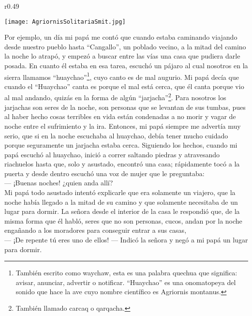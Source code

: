 \ifdefined\EnableIncludeImages
\begin{wrapfigure}{r}{0.49\textwidth}
  \begin{center}
  \vspace{-20pt}
    \texttt{[image: AgriornisSolitariaSmit.jpg]}
  \end{center}
  \vspace{-20pt}
\end{wrapfigure}
\fi
Por ejemplo, un día mi papá me contó que cuando estaba caminando viajando desde nuestro pueblo hasta ``Cangallo'', un poblado vecino, a la mitad del camino la noche lo atrapó, y empezó a buscar entre las vías una casa que pudiera darle posada. En cuanto él estaba en esa tarea, escuchó un pájaro al cual nosotros en la sierra llamamos ``huaychao''\footnote{También escrito como waychaw, esta es una palabra quechua que significa: avisar, anunciar, advertir o notificar. ``Huaychao'' es una onomatopeya del sonido que hace la ave cuyo nombre científico es Agriornis montanus.}, cuyo canto es de mal augurio.
Mi papá decía que cuando el ``Huaychao'' canta es porque el mal está cerca, que él canta porque vio al mal andando, quizás en la forma de algún ``jarjacha''\footnote{También llamado carcaq o qarqacha.}. Para nosotros los jarjachas son seres de la noche, son personas que se levantan de sus tumbas, pues al haber hecho cosas terribles en vida están condenadas a no morir y vagar de noche entre el sufrimiento y la ira.
Entonces, mi papá siempre me advertía muy serio, que si en la noche escuchaba al huaychao, debía tener mucho cuidado porque seguramente un jarjacha estaba cerca.
Siguiendo los hechos, cuando mi papá escuchó al huaychao, inició a correr saltando piedras y atravesando riachuelos hasta que, solo y asustado, encontró una casa; rápidamente tocó a la puerta y desde dentro escuchó una voz de mujer que le preguntaba:\\\indent
--- ¡Buenas noches! ¿quien anda allí?\\\indent
Mi papá todo asustado intentó explicarle que era solamente un viajero, que la noche había llegado a la mitad de su camino y que solamente necesitaba de un lugar para dormir. La señora desde el interior de la casa le respondió que, de la misma forma que él habló, seres que no son personas, cucos, andan por la noche engañando a los moradores para conseguir entrar a sus casas,\\\indent
--- ¡De repente tú eres uno de ellos! --- Indicó la señora y negó a mi papá un lugar para dormir. \\\indent
